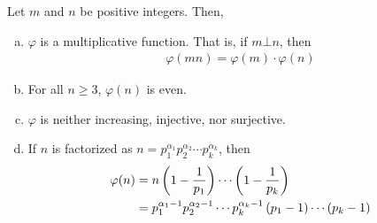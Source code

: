 	\begin{theorem}\label{thm:phiproperties-ch:arith}
		Let $m$ and $n$ be positive integers. Then,
			\begin{enumerate}[(a)]
				\item $\varphi$ is a multiplicative function. That is, if $m \bot n$, then
					\begin{align*}
						\varphi(mn)=\varphi(m) \cdot \varphi (n)
					\end{align*}
				\item For all $n \geq 3$, $\varphi(n)$ is even.
				\item $\varphi$ is neither increasing, injective, nor surjective.
				\item If $n$ is factorized as $n= p_1^{\alpha_1} p_2^{\alpha_2} \cdots p_k^{\alpha_k}$, then
					\begin{align*}
						\varphi(n) & =  n \left(1 - \frac{1}{p_1}\right) \cdots\left(1 - \frac{1}{p_k}\right)\\
					   & =  p_1^{\alpha_1-1} p_2^{\alpha_2-1} \cdots p_k^{\alpha_k-1}\left(p_1 -1\right)\cdots(p_k -1)
					\end{align*}
			\end{enumerate}
	\end{theorem}

